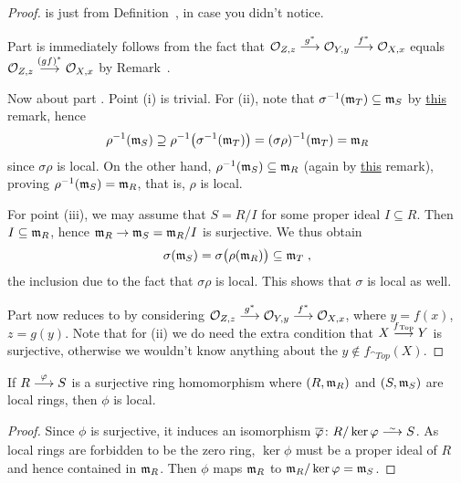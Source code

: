 \documentclass[a4paper,parskip=half,numbers=enddot, DIV=12]{scrreprt}
\begin{document}
\begin{proof}
	 is just \itememph{\alpha} from Definition~, in case you didn't notice.
	
	Part  is immediately follows from the fact that $\Oo_{Z,z}\morphism[g^*]\Oo_{Y,y}\morphism[f^*]\Oo_{X,x}$ equals $\Oo_{Z,z}\morphism[(gf)^*]\Oo_{X,x}$ by Remark~.
	
	Now about part . Point (i) is trivial. For (ii), note that $\sigma^{-1}(\mathfrak{m}_T)\subseteq\mathfrak{m}_S$ by \hyperref[rem:localMorphismStuff]{this} remark, hence
	\begin{align*}
		\rho^{-1}(\mathfrak{m}_S) \supseteq \rho^{-1}\big(\sigma^{-1}(\mathfrak{m}_T)\big) = (\sigma\rho)^{-1} (\mathfrak{m}_T) = \mathfrak{m}_R
	\end{align*}
	since $\sigma\rho$ is local. On the other hand, $\rho^{-1}(\mathfrak{m}_S)\subseteq \mathfrak{m}_R$ (again by \hyperref[rem:localMorphismStuff]{this} remark), proving $\rho^{-1}(\mathfrak{m}_S)=\mathfrak{m}_R$, that is, $\rho$ is local.
	
	For point (iii), we may assume that $S=R/I$ for some proper ideal $I\subseteq R$. Then $I\subseteq\mathfrak{m}_R$, hence $\mm_R\morphism \mm_S=\mm_R/I$ is surjective. We thus obtain
	\begin{align*}
		\sigma(\mathfrak{m}_S)=\sigma\big(\rho(\mathfrak{m}_R)\big)\subseteq\mathfrak{m}_T\;,
	\end{align*}
	the inclusion due to the fact that $\sigma\rho$ is local. This shows that $\sigma$ is local as well.
	
	Part  now reduces to  by considering $\Oo_{Z,z}\morphism[g^*]\Oo_{Y,y}\morphism[f^*]\Oo_{X,x}$, where $y=f(x)$, $z=g(y)$. Note that for (ii) we do need the extra condition that $X\morphism[\smash{f}_{\cat{Top}}]Y$ is surjective, otherwise we wouldn't know anything about the $y\not\in f_{\cat{Top}}(X)$.
\end{proof}
\begin{fact}
    If $R\morphism[\phi]S$ is a surjective ring homomorphism where $(R,\mathfrak{m}_R)$ and $(S,\mathfrak{m}_S)$ are local rings, then $\phi$ is local.
\end{fact}
\begin{proof}
	Since $\phi$ is surjective, it induces an isomorphism $\ov{\phi}\colon R/\ker\phi\isomorphism S$. As local rings are forbidden to be the zero ring, $\ker\phi$ must be a proper ideal of $R$ and hence contained in $\mathfrak{m}_R$. Then $\phi$ maps $\mathfrak{m}_R$ to $\mathfrak{m}_R/\ker\varphi=\mathfrak{m}_S$.
\end{proof}
\end{document}
